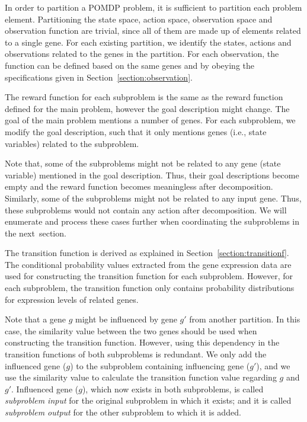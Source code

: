 In order to partition a POMDP problem, it is sufficient to partition each problem element. Partitioning the
state space, action space, observation space and observation function are trivial, since all of them are made
up of elements related to a single gene. For each existing partition, we identify the states, actions and
observations related to the genes in the partition. For each observation, the function can be defined based
on the same genes and by obeying the specifications given in Section~\ref{section:observation}.

The reward function for each subproblem is the same as the reward function defined for the main problem,
however the goal description might change. The goal of the main problem mentions a number of genes. For each
subproblem, we modify the goal description, such that it only mentions genes (i.e., state variables) related
to the subproblem.

Note that, some of the subproblems might not be related to any gene (state variable) mentioned in the goal
description. Thus, their goal descriptions become empty and the reward function becomes meaningless after
decomposition. Similarly, some of the subproblems might not be related to any input gene. Thus, these
subproblems would not contain any action after decomposition. We will enumerate and process these cases
further when coordinating the subproblems in the next~section.

The transition function is derived as explained in Section~\ref{section:transitionf}. The conditional
probability values extracted from the gene expression data are used for constructing the transition function
for each subproblem. However, for each subproblem, the transition function only contains probability
distributions for expression levels of related genes.

Note that a gene $g$ might be influenced by gene $g'$ from another partition. In this case, the similarity
value between the two genes should be used when constructing the transition function. However, using this
dependency in the transition functions of both subproblems is redundant. We only add the influenced gene
($g$) to the subproblem containing influencing gene ($g'$), and we use the similarity value to calculate the
transition function value regarding $g$ and $g'$. Influenced gene ($g$), which now exists in both
subproblems, is called \emph{subproblem input} for the original subproblem in which it exists; and it is
called \emph{subproblem output} for the other subproblem to which it is added.

